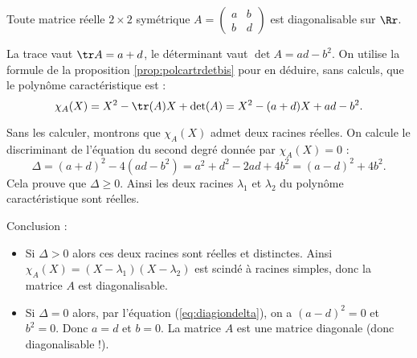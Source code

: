 \documentclass[12pt, class=report,crop=false]{standalone}
\begin{document}
\begin{exemple}
Toute matrice réelle $2 \times 2$ symétrique
$A = \left(\begin{array}{cc}
a & b \\
b & d
\end{array}\right)$
est diagonalisable sur $\Rr$. 

La trace vaut $\tr A = a+d$, le déterminant vaut $\det A = ad-b^2$.
On utilise la formule de la proposition \ref{prop:polcartrdetbis} pour en déduire, sans calculs, que le polynôme caractéristique est :
$$\chi_A(X) = X^2 - \tr(A) X + \det(A) = X^2 - (a+d) X + ad-b^2.$$

Sans les calculer, montrons que $\chi_A(X)$ admet deux racines réelles.
On calcule le discriminant de l'équation du second degré donnée par $\chi_A(X)=0$ :
\begin{equation}
\label{eq:diagiondelta}
\Delta  = (a+d)^2 - 4(ad-b^2) = a^2+d^2 -2ad +4b^2 = (a-d)^2 + 4b^2.
\end{equation}
Cela prouve que $\Delta \ge 0$. Ainsi les deux racines $\lambda_1$ et $\lambda_2$ du polynôme caractéristique sont réelles.


Conclusion :
\begin{itemize}

  \item Si $\Delta > 0$ alors ces deux racines sont réelles et distinctes. Ainsi $\chi_A(X) = (X-\lambda_1)(X-\lambda_2)$ est scindé à racines simples, donc la matrice $A$ est diagonalisable.
  
  \item Si $\Delta =0$ alors, par l'équation (\ref{eq:diagiondelta}), on a $(a-d)^2 = 0$ et $b^2=0$. Donc
  $a=d$ et $b=0$. La matrice $A$ est une matrice diagonale (donc diagonalisable !).
\end{itemize}
\end{exemple}
\end{document}
